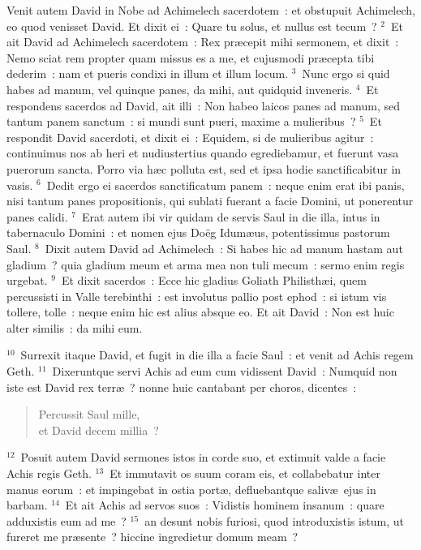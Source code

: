 \lettrine[lines=10,image=true,loversize=0.05,lraise=-0.03]{V}{}enit autem David in Nobe ad Achimelech sacerdotem~: et obstupuit Achimelech, eo quod venisset David. Et dixit ei~: Quare tu solus, et nullus est tecum~?
${}^{2}$~Et ait David ad Achimelech sacerdotem~: Rex pr\ae cepit mihi sermonem, et dixit~: Nemo sciat rem propter quam missus es a me, et cujusmodi pr\ae cepta tibi dederim~: nam et pueris condixi in illum et illum locum.
${}^{3}$~Nunc ergo si quid habes ad manum, vel quinque panes, da mihi, aut quidquid inveneris.
${}^{4}$~Et respondens sacerdos ad David, ait illi~: Non habeo laicos panes ad manum, sed tantum panem sanctum~: si mundi sunt pueri, maxime a mulieribus~?
${}^{5}$~Et respondit David sacerdoti, et dixit ei~: Equidem, si de mulieribus agitur~: continuimus nos ab heri et nudiustertius quando egrediebamur, et fuerunt vasa puerorum sancta. Porro via h\ae c polluta est, sed et ipsa hodie sanctificabitur in vasis.
${}^{6}$~Dedit ergo ei sacerdos sanctificatum panem~: neque enim erat ibi panis, nisi tantum panes propositionis, qui sublati fuerant a facie Domini, ut ponerentur panes calidi.
${}^{7}$~Erat autem ibi vir quidam de servis Saul in die illa, intus in tabernaculo Domini~: et nomen ejus Do\"eg Idum\ae us, potentissimus pastorum Saul.
${}^{8}$~Dixit autem David ad Achimelech~: Si habes hic ad manum hastam aut gladium~? quia gladium meum et arma mea non tuli mecum~: sermo enim regis urgebat.
${}^{9}$~Et dixit sacerdos~: Ecce hic gladius Goliath Philisth\ae i, quem percussisti in Valle terebinthi~: est involutus pallio post ephod~: si istum vis tollere, tolle~: neque enim hic est alius absque eo. Et ait David~: Non est huic alter similis~: da mihi eum.


${}^{10}$~Surrexit itaque David, et fugit in die illa a facie Saul~: et venit ad Achis regem Geth.
${}^{11}$~Dixeruntque servi Achis ad eum cum vidissent David~: Numquid non iste est David rex terr\ae~? nonne huic cantabant per choros, dicentes~: \begin{flushleft}\begin{verse}Percussit Saul mille,\\ et David decem millia~?\end{verse}\end{flushleft}


${}^{12}$~Posuit autem David sermones istos in corde suo, et extimuit valde a facie Achis regis Geth.
${}^{13}$~Et immutavit os suum coram eis, et collabebatur inter manus eorum~: et impingebat in ostia port\ae , defluebantque saliv\ae\ ejus in barbam.
${}^{14}$~Et ait Achis ad servos suos~: Vidistis hominem insanum~: quare adduxistis eum ad me~?
${}^{15}$~an desunt nobis furiosi, quod introduxistis istum, ut fureret me pr\ae sente~? hiccine ingredietur domum meam~?

